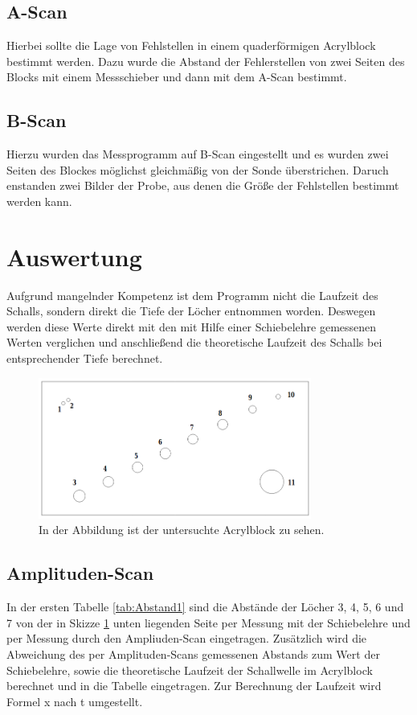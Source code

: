 \documentclass[titlepage = firstcover]{scrartcl}
\begin{document}
        \subsection*{A-Scan}
          Hierbei sollte die Lage von Fehlstellen in einem quaderförmigen Acrylblock bestimmt werden. Dazu wurde die Abstand der Fehlerstellen von zwei Seiten des Blocks mit einem Messschieber und dann mit dem A-Scan bestimmt.
        \subsection*{B-Scan}
          Hierzu wurden das Messprogramm auf B-Scan eingestellt und es wurden zwei Seiten des Blockes möglichst gleichmäßig von der Sonde überstrichen. Daruch enstanden zwei Bilder der Probe, aus denen die Größe der Fehlstellen bestimmt werden kann.
      
    \newpage
    \section{Auswertung}
        Aufgrund mangelnder Kompetenz ist dem Programm nicht die Laufzeit des Schalls, sondern direkt die Tiefe der Löcher entnommen worden. Deswegen werden diese Werte direkt mit den mit Hilfe
        einer Schiebelehre gemessenen Werten verglichen und anschließend die theoretische Laufzeit des Schalls bei entsprechender Tiefe berechnet.

        \FloatBarrier

        \begin{figure}[h]
          \centering
          \includegraphics[width = 0.8\textwidth]{Bilder/DerBlock.png}
          \caption{In der Abbildung ist der untersuchte Acrylblock zu sehen.}
          \label{fig:DerBlock}
        \end{figure}

        \FloatBarrier

        \noindent


        \subsection{Amplituden-Scan}
            In der ersten Tabelle \ref{tab:Abstand1} sind die Abstände der Löcher 3, 4, 5, 6 und 7 von der in Skizze \ref{fig:DerBlock} unten liegenden Seite per Messung mit der Schiebelehre und per Messung durch den 
            Ampliuden-Scan eingetragen. Zusätzlich wird die Abweichung des per Amplituden-Scans gemessenen Abstands zum Wert der Schiebelehre, sowie die theoretische Laufzeit der Schallwelle im
            Acrylblock berechnet und in die Tabelle eingetragen. Zur Berechnung der Laufzeit wird Formel x nach t umgestellt.
\end{document}
